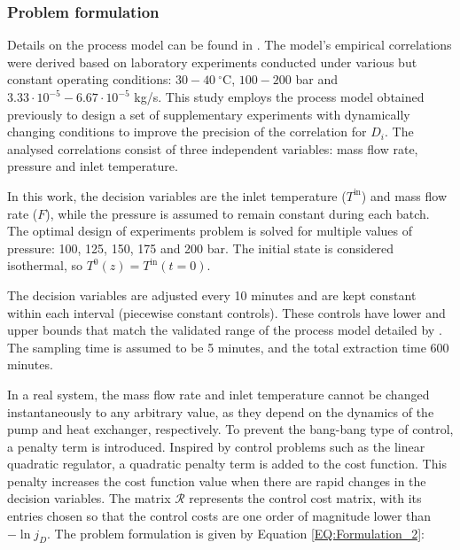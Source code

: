 \documentclass[a4paper,fleqn]{cas-dc}
\begin{document}
		\subsubsection{Problem formulation}
		
		Details on the process model can be found in \citet{Sliczniuk2024}. The model's empirical correlations were derived based on laboratory experiments conducted under various but constant operating conditions: $30 - 40~^\circ\text{C}$, $100 - 200$ bar and $3.33 \cdot 10^{-5} - 6.67 \cdot 10^{-5}$ kg/s. This study employs the process model obtained previously to design a set of supplementary experiments with dynamically changing conditions to improve the precision of the correlation for $D_i$. The analysed correlations consist of three independent variables: mass flow rate, pressure and inlet temperature. 
		
		In this work, the decision variables are the inlet temperature ($T^{\text{in}}$) and mass flow rate ($F$), while the pressure is assumed to remain constant during each batch. The optimal design of experiments problem is solved for multiple values of pressure: 100, 125, 150, 175 and 200 bar. The initial state is considered isothermal, so $T^0(z) = T^{\text{in}}(t=0)$.
		
		The decision variables are adjusted every 10 minutes and are kept constant within each interval (piecewise constant controls). These controls have lower and upper bounds that match the validated range of the process model detailed by \citet{Sliczniuk2024}. The sampling time is assumed to be 5 minutes, and the total extraction time 600 minutes.
		
		In a real system, the mass flow rate and inlet temperature cannot be changed instantaneously to any arbitrary value, as they depend on the dynamics of the pump and heat exchanger, respectively. To prevent the bang-bang type of control, a penalty term is introduced. Inspired by control problems such as the linear quadratic regulator, a quadratic penalty term is added to the cost function. This penalty increases the cost function value when there are rapid changes in the decision variables. The matrix $\mathcal{R}$ represents the control cost matrix, with its entries chosen so that the control costs are one order of magnitude lower than $-\ln j_D$. The problem formulation is given by Equation \ref{EQ:Formulation_2}:
		
\end{document}
